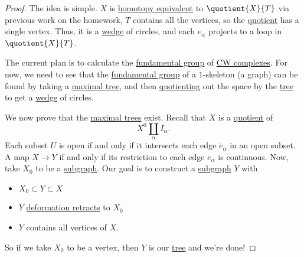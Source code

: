 \begin{proof}
	The idea is simple. \(X\) is \hyperref[def:homotopy-equivalence]{homotopy equivalent} to \(\quotient{X}{T}\) via previous work on the homework,
	\(T\) contains all the vertices, so the \hyperref[CW-complex-quotient]{quotient} has a single vertex. Thus, it is a
	\hyperref[CW-complex-wedge-sum]{wedge} of circles, and each \(e_\alpha \) projects to a loop in \(\quotient{X}{T} \).
	\begin{figure}[H]
		\centering
		\label{fig:pf:lec12-1}
	\end{figure}

	\par The current plan is to calculate the  \hyperref[def:fundamental-group]{fundamental group} of \hyperref[def:CW-Complex]{CW complexes}.
	For now, we need to see that the \hyperref[def:fundamental-group]{fundamental group} of a \(1\)-skeleton (a graph) can be found by taking
	a \hyperref[def:maximal-tree]{maximal tree}, and then \hyperref[CW-complex-quotient]{quotienting} out the space by the \hyperref[def:tree]{tree}
	to get a \hyperref[CW-complex-wedge-sum]{wedge} of circles.
	\begin{figure}[H]
		\centering
		\label{fig:pf:lec12-2}
	\end{figure}

	\par We now prove that the \hyperref[def:maximal-tree]{maximal trees} exist. Recall that \(X\) is a \hyperref[CW-complex-quotient]{quotient} of
	\[
		X^0\coprod_\alpha I_\alpha.
	\]
	Each subset \(U\) is open if and only if it intersects each edge \(\overline{e} _\alpha \) in an open subset. A map \(X\to Y\) if and only if
	its restriction to each edge \(\overline{e} _\alpha \) is continuous. Now, take \(X_0\) to be a \hyperref[def:subgraph]{subgraph}.
	Our goal is to construct a \hyperref[def:subgraph]{subgraph} \(Y\) with
	\begin{itemize}
		\item \(X_0 \subset Y\subset X\)
		\item \(Y\) \hyperref[def:deformation-retraction]{deformation retracts} to \(X_0\)
		\item \(Y\) contains all vertices of \(X\).
	\end{itemize}

	So if we take \(X_0\) to be a vertex, then \(Y\) is our \hyperref[def:tree]{tree} and we're done!


\end{proof}
